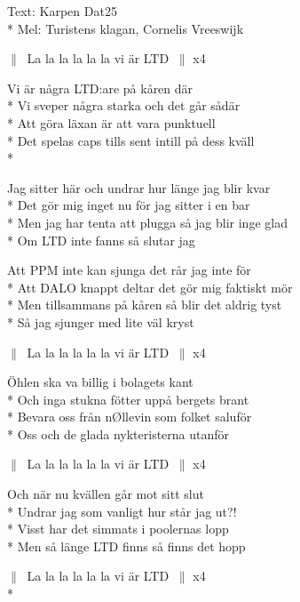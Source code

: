 \begin{SongText}
    \begin{SongInfo}
        Text: Karpen Dat25\\*%
        Mel: Turistens klagan, Cornelis Vreeswijk
    \end{SongInfo}
    \begin{SongVerse}
        $\|\:$ La la la la la la vi är LTD $\:\|$ x4

        Vi är några LTD:are på kåren där\\*%
        Vi sveper några starka och det går sådär\\*%
        Att göra läxan är att vara punktuell\\*%
        Det spelas caps tills sent intill på dess kväll\\*%
    \end{SongVerse}
    \begin{SongVerse}
        Jag sitter här och undrar hur länge jag blir kvar\\*%
        Det gör mig inget nu för jag sitter i en bar\\*%
        Men jag har tenta att plugga så jag blir inge glad\\*%
        Om LTD inte fanns så slutar jag
    \end{SongVerse}
    \begin{SongVerse}
        Att PPM inte kan sjunga det rår jag inte för\\*%
        Att DALO knappt deltar det gör mig faktiskt mör\\*%
        Men tillsammans på kåren så blir det aldrig tyst\\*%
        Så jag sjunger med lite väl kryst
    \end{SongVerse}
    \begin{SongVerse}
        $\|\:$ La la la la la la vi är LTD $\:\|$ x4

        Öhlen ska va billig i bolagets kant\\*%
        Och inga stukna fötter uppå bergets brant\\*%
        Bevara oss från nØllevin som folket saluför\\*%
        Oss och de glada nykteristerna utanför
    \end{SongVerse}
    \begin{SongVerse}
        $\|\:$ La la la la la la vi är LTD $\:\|$ x4

        Och när nu kvällen går mot sitt slut\\*%
        Undrar jag som vanligt hur står jag ut?!\\*%
        Visst har det simmats i poolernas lopp\\*%
        Men så länge LTD finns så finns det hopp
    \end{SongVerse}
    \begin{SongVerse}
        $\|\:$ La la la la la la vi är LTD $\:\|$ x4\\*%
        

\end{SongVerse}
\end{SongText}
